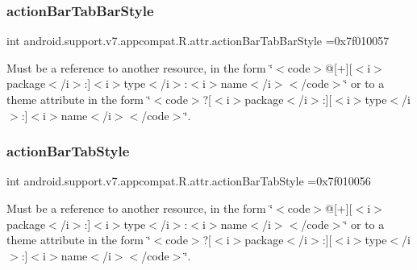 \subsubsection{\texorpdfstring{action\+Bar\+Tab\+Bar\+Style}{actionBarTabBarStyle}}
{\footnotesize\ttfamily int android.\+support.\+v7.\+appcompat.\+R.\+attr.\+action\+Bar\+Tab\+Bar\+Style =0x7f010057\hspace{0.3cm}{\ttfamily [static]}}

Must be a reference to another resource, in the form \char`\"{}$<$code$>$@\mbox{[}+\mbox{]}\mbox{[}$<$i$>$package$<$/i$>$\+:\mbox{]}$<$i$>$type$<$/i$>$\+:$<$i$>$name$<$/i$>$$<$/code$>$\char`\"{} or to a theme attribute in the form \char`\"{}$<$code$>$?\mbox{[}$<$i$>$package$<$/i$>$\+:\mbox{]}\mbox{[}$<$i$>$type$<$/i$>$\+:\mbox{]}$<$i$>$name$<$/i$>$$<$/code$>$\char`\"{}. \mbox{\label{classandroid_1_1support_1_1v7_1_1appcompat_1_1R_1_1attr_ac8dabb7ecb7995fda674a5ecc8eca50d}} 
\subsubsection{\texorpdfstring{action\+Bar\+Tab\+Style}{actionBarTabStyle}}
{\footnotesize\ttfamily int android.\+support.\+v7.\+appcompat.\+R.\+attr.\+action\+Bar\+Tab\+Style =0x7f010056\hspace{0.3cm}{\ttfamily [static]}}

Must be a reference to another resource, in the form \char`\"{}$<$code$>$@\mbox{[}+\mbox{]}\mbox{[}$<$i$>$package$<$/i$>$\+:\mbox{]}$<$i$>$type$<$/i$>$\+:$<$i$>$name$<$/i$>$$<$/code$>$\char`\"{} or to a theme attribute in the form \char`\"{}$<$code$>$?\mbox{[}$<$i$>$package$<$/i$>$\+:\mbox{]}\mbox{[}$<$i$>$type$<$/i$>$\+:\mbox{]}$<$i$>$name$<$/i$>$$<$/code$>$\char`\"{}. \mbox{\label{classandroid_1_1support_1_1v7_1_1appcompat_1_1R_1_1attr_aba611b517de855c7a18d3a60783bfa3a}} 
